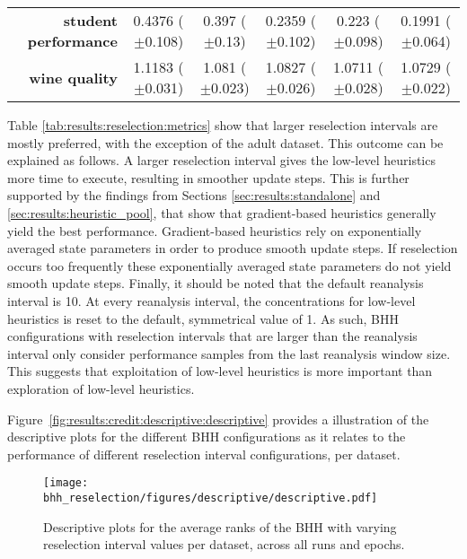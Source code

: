 \begin{table}[htbp]
{\begin{tabular}{r|ccccc}
			\textbf{student performance} & \cellcolor[rgb]{ .973,  .412,  .42}0.4376 ($\pm$0.108)  & \cellcolor[rgb]{ .98,  .518,  .443}0.397 ($\pm$0.13)    & \cellcolor[rgb]{ 1,  .922,  .518}0.2359 ($\pm$0.102)    & \cellcolor[rgb]{ .784,  .859,  .502}0.223 ($\pm$0.098)  & \cellcolor[rgb]{ .388,  .745,  .482}0.1991 ($\pm$0.064) \\
			\textbf{wine quality}        & \cellcolor[rgb]{ .973,  .412,  .42}1.1183 ($\pm$0.031)  & \cellcolor[rgb]{ 1,  .922,  .518}1.081 ($\pm$0.023)     & \cellcolor[rgb]{ 1,  .898,  .514}1.0827 ($\pm$0.026)    & \cellcolor[rgb]{ .388,  .745,  .482}1.0711 ($\pm$0.028) & \cellcolor[rgb]{ .498,  .776,  .486}1.0729 ($\pm$0.022) \\
		\end{tabular}%


	}
\end{table}%

Table \ref{tab:results:reselection:metrics} show that larger reselection intervals are mostly preferred, with the exception of the adult dataset. This outcome can be explained as follows. A larger reselection interval gives the low-level heuristics more time to execute, resulting in smoother update steps. This is further supported by the findings from Sections \ref{sec:results:standalone} and \ref{sec:results:heuristic_pool}, that show that gradient-based heuristics generally yield the best performance. Gradient-based heuristics rely on exponentially averaged state parameters in order to produce smooth update steps. If reselection occurs too frequently these exponentially averaged state parameters do not yield smooth update steps. Finally, it should be noted that the default reanalysis interval is 10. At every reanalysis interval, the concentrations for low-level heuristics is reset to the default, symmetrical value of 1. As such, \acs{BHH} configurations with reselection intervals that are larger than the reanalysis interval only consider performance samples from the last reanalysis window size. This suggests that exploitation of low-level heuristics is more important than exploration of low-level heuristics.

Figure~\ref{fig:results:credit:descriptive:descriptive} provides a illustration of the descriptive plots for the different \acs{BHH} configurations as it relates to the performance of different reselection interval configurations, per dataset.

\begin{figure}[htbp]
	\centering
	\texttt{[image: bhh\_reselection/figures/descriptive/descriptive.pdf]}
	\caption{Descriptive plots for the average ranks of the \acs{BHH} with varying reselection interval values per dataset, across all runs and epochs.}
	\label{fig:results:reselection:descriptive:descriptive}
\end{figure}


